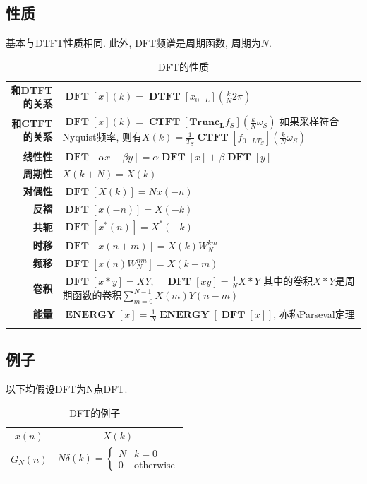 \documentclass{ctexart}
\DeclareMathOperator{\CTFT}{\mathbf{CTFT}}
\DeclareMathOperator{\DTFT}{\mathbf{DTFT}}
\DeclareMathOperator{\DFT}{\mathbf{DFT}}
\DeclareMathOperator{\ENERGY}{\mathbf{ENERGY}}
\newlength{\Oldarrayrulewidth}
\newcommand{\Hline}[1]{
  \noalign{\global\setlength{\Oldarrayrulewidth}{\arrayrulewidth}}
  \noalign{\global\setlength{\arrayrulewidth}{#1}}\hline
  \noalign{\global\setlength{\arrayrulewidth}{\Oldarrayrulewidth}}}
\newcommand{\Topline}{\Hline{0.08em}}
\newcommand{\Bottomline}{\Hline{0.08em}}
\newcommand{\Midline}{\Hline{0.05em}}
\begin{document}
\subsection{性质}
    基本与DTFT性质相同. 此外, DFT频谱是周期函数, 周期为$N$.
    \begin{table}[ht!]
    \begin{tabularx}{\textwidth}{|>{\bfseries}r  L|}
        \Topline
        和DTFT的关系 &  $\DFT[x](k) = \DTFT[x_{0\ldots L}](\frac{k}{N} 2\pi)$    \\
        和CTFT的关系 &  $\DFT[x](k) = \CTFT[\mathbf{Trunc_L} f_{S}](\frac{k}{N} \omega_S)$\newline
                        如果采样符合Nyquist频率, 则有$X(k) = \frac{1}{T_S} \CTFT[f_{0\ldots LT_S}] (\frac{k}{N} \omega_S)$ \\
        线性性 &  $\displaystyle \DFT[\alpha x + \beta y] = \alpha \DFT[x] + \beta \DFT[y]$    \\
        周期性 &  $\displaystyle X(k + N) = X(k)$    \\
        对偶性 &  $\displaystyle \DFT[X(k)] = N x(-n)$    \\
        反褶 &  $\displaystyle \DFT[x(-n)] = X(-k)$    \\
        共轭 &  $\displaystyle \DFT[x^*(n)] = X^*(-k)$    \\
        时移 &  $\displaystyle \DFT[x(n + m)] = X(k) W_N^{km}$    \\
        频移 &  $\displaystyle \DFT[x(n) W_N^{nm}] = X(k + m)$    \\
        卷积 &  $\displaystyle \DFT[x * y] = X Y,\quad \DFT[x y] = \frac{1}{N} X * Y$\newline
            其中的卷积$X * Y$是周期函数的卷积$\sum_{m = 0}^{N-1} X(m) Y(n-m)$   \\
        能量 &  $\displaystyle \ENERGY[x] = \frac{1}{N} \ENERGY[\DFT[x]]$, 亦称Parseval定理\\
        \Bottomline
    \end{tabularx}
    \caption{DFT的性质}
    \end{table}

\subsection{例子}
    以下均假设DFT为N点DFT.
    \begin{table}[ht!]
    \centering
    \begin{tabularx}{\textwidth}{|CC|}
            \Topline $\displaystyle x(n)$ & $\displaystyle X(k)$ \\ \Midline
            $\displaystyle G_N(n)$ & $\displaystyle N\delta(k) = \begin{cases} N & k = 0\\ 0 & \text{otherwise}\end{cases}$
            \\
            \Bottomline
    \end{tabularx}
    \caption{DFT的例子}
    \end{table}
\end{document}
